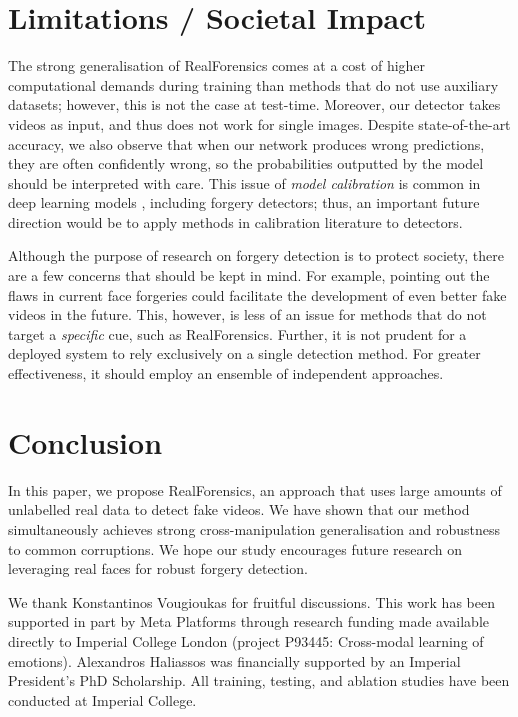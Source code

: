 \documentclass[10pt,twocolumn,letterpaper]{article}
\begin{document}
\section{Limitations / Societal Impact}
The strong generalisation of RealForensics comes at a cost of higher computational demands during training than methods that do not use auxiliary datasets; however, this is not the case at test-time. Moreover, our detector takes videos as input, and thus does not work for single images. Despite state-of-the-art accuracy, we also observe that when our network produces wrong predictions, they are often confidently wrong, so the probabilities outputted by the model should be interpreted with care. This issue of \textit{model calibration} is common in deep learning models \cite{guo2017calibration}, including forgery detectors; thus, an important future direction would be to apply methods in calibration literature \cite{guo2017calibration} to detectors. 

Although the purpose of research on forgery detection is to protect society, there are a few concerns that should be kept in mind. For example, pointing out the flaws in current face forgeries could facilitate the development of even better fake videos in the future. This, however, is less of an issue for methods that do not target a \textit{specific} cue, such as RealForensics. Further, it is not prudent for a deployed system to rely exclusively on a single detection method. For greater effectiveness, it should employ an ensemble of independent approaches.

\section{Conclusion}
In this paper, we propose RealForensics, an approach that uses large amounts of unlabelled real data to detect fake videos. We have shown that our method simultaneously achieves strong cross-manipulation generalisation and robustness to common corruptions. We hope our study encourages future research on leveraging real faces for robust forgery detection.

\begin{description}[wide,itemindent=\labelsep]
\item[Acknowledgements.] We thank Konstantinos Vougioukas for fruitful discussions. This work has been supported in part by Meta Platforms through research funding made available directly to Imperial College London (project P93445: Cross-modal learning of emotions). Alexandros Haliassos was financially supported by an Imperial President's PhD Scholarship. All training, testing, and ablation studies have been conducted at Imperial College. 
\end{description}
\end{document}

